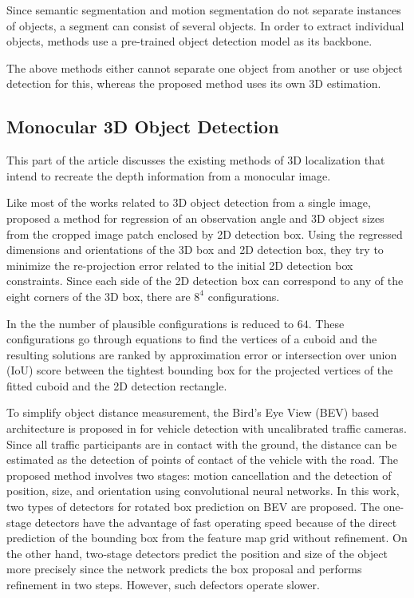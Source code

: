 \documentclass[graybox]{svmult}
\begin{document}
Since semantic segmentation and motion segmentation do not
separate instances of objects, a segment can consist of several objects.
In order to extract individual objects, methods use a pre-trained object detection model \cite{fusionseg} as its backbone.

The above methods either cannot separate one object from another or use object detection for this, whereas the proposed method uses its own 3D estimation. 

\subsection{Monocular 3D Object Detection}
This part of the article discusses the existing methods of 3D localization that intend to recreate the depth information from a monocular image.

Like most of the works related to 3D object detection from a single image, \cite{3d_geom} proposed a method for regression of an observation angle and 3D object sizes from the cropped image patch enclosed by 2D detection box. Using the regressed dimensions and orientations of the 3D box and 2D detection box, they try to minimize the re-projection error related to the initial 2D detection box constraints.
Since each side of the 2D detection box can correspond to any of the eight corners of the 3D box, there are $8^4$ configurations.


In the \cite{3d_geom_reduced} the number of plausible configurations is reduced to $64$.
These configurations go through equations to find the vertices of a cuboid and the resulting solutions are ranked by approximation error or intersection over union (IoU) score between the tightest bounding box for the projected vertices of the fitted cuboid and the 2D detection rectangle.


To simplify object distance measurement, the Bird's Eye View (BEV) based architecture is proposed in  
\cite{bev_1} for vehicle detection with uncalibrated traffic cameras. Since all traffic participants are in contact with the ground, the distance can be estimated as the detection of points of contact of the vehicle with the road. The proposed method involves two stages: motion cancellation and the detection of position, size,
and orientation using convolutional neural networks. In this work, two types of detectors for rotated box prediction on BEV are proposed.
The one-stage detectors have the advantage of fast operating speed because of the direct prediction of the bounding box from the feature map grid without refinement.
On the other hand, two-stage detectors predict the position and size of the object more precisely since the network predicts the box proposal and performs refinement in two steps.
However, such defectors operate slower.
\end{document}
